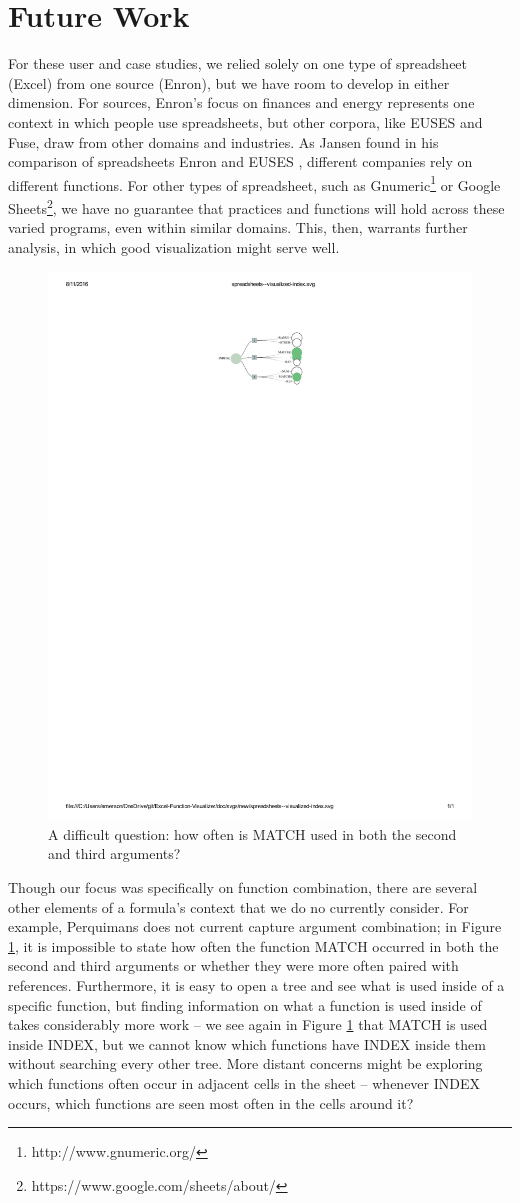 \documentclass[conference]{IEEEtran}
\newcommand{\toolname}{Perquimans\xspace} \newcommand{\toolnameend}{Perquimans}
\begin{document}
	\section{Future Work}
	
	For these user and case studies, we relied solely on one type of spreadsheet (Excel)
	from one source (Enron), but we have room to develop in either dimension. For sources, 
	Enron's focus on finances and energy represents one context in
	which people use spreadsheets, but other corpora, like EUSES and Fuse, draw from
	other domains and industries. As Jansen found in his comparison of
	spreadsheets Enron and EUSES \cite{jansen2015enron}, different companies rely
	on different functions. For other types of spreadsheet, such as Gnumeric\footnote{http://www.gnumeric.org/} or Google
	Sheets\footnote{https://www.google.com/sheets/about/}, we have no
	guarantee that practices and functions will hold across these varied programs, even within
	similar domains. This, then, warrants further analysis, in which good visualization might serve
	well. \par	
	
	\begin{figure} \centering \includegraphics[width=.4\textwidth]{index}
		\caption{A difficult question: how often is MATCH used in both the second and
			third arguments?} \label{fig:index} \end{figure}
	
	Though our focus was specifically on function combination, there are several
	other elements of a formula's context that we do no currently consider. For
	example, \toolname does not current capture argument combination; in Figure
	\ref{fig:index}, it is impossible to state how often the function MATCH
	occurred in both the second and third arguments or whether they were more often
	paired with references. Furthermore, it is easy to open a tree and see what is
	used inside of a specific function, but finding information on what a function
	is used inside of takes considerably more work -- we see again in Figure
	\ref{fig:index} that MATCH is used inside INDEX, but we cannot know which
	functions have INDEX inside them without searching every other tree. More
	distant concerns might be exploring which functions often occur in adjacent
	cells in the sheet -- whenever INDEX occurs, which functions are seen most
	often in the cells around it?
	
\end{document}
